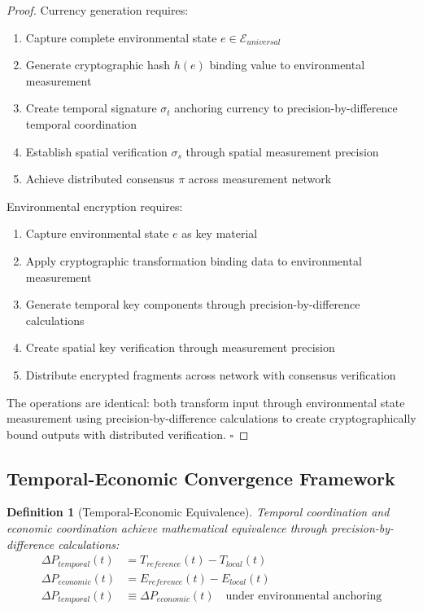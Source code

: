 \documentclass[12pt,a4paper]{article}
\newtheorem{definition}[theorem]{Definition}
\begin{document}
\begin{proof}
Currency generation requires:
\begin{enumerate}
\item Capture complete environmental state $e \in \mathcal{E}_{universal}$
\item Generate cryptographic hash $h(e)$ binding value to environmental measurement
\item Create temporal signature $\sigma_t$ anchoring currency to precision-by-difference temporal coordination
\item Establish spatial verification $\sigma_s$ through spatial measurement precision
\item Achieve distributed consensus $\pi$ across measurement network
\end{enumerate}

Environmental encryption requires:
\begin{enumerate}
\item Capture environmental state $e$ as key material
\item Apply cryptographic transformation binding data to environmental measurement
\item Generate temporal key components through precision-by-difference calculations
\item Create spatial key verification through measurement precision
\item Distribute encrypted fragments across network with consensus verification
\end{enumerate}

The operations are identical: both transform input through environmental state measurement using precision-by-difference calculations to create cryptographically bound outputs with distributed verification. $\square$
\end{proof}

\subsection{Temporal-Economic Convergence Framework}

\begin{definition}[Temporal-Economic Equivalence]
Temporal coordination and economic coordination achieve mathematical equivalence through precision-by-difference calculations:
\begin{align}
\Delta P_{temporal}(t) &= T_{reference}(t) - T_{local}(t) \\
\Delta P_{economic}(t) &= E_{reference}(t) - E_{local}(t) \\
\Delta P_{temporal}(t) &\equiv \Delta P_{economic}(t) \quad \text{under environmental anchoring}
\end{align}
\end{definition}
\end{document}
